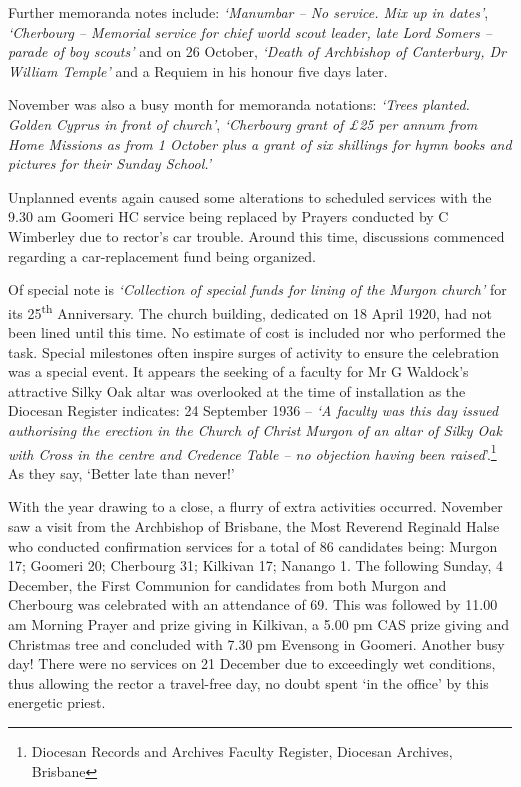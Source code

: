 Further memoranda notes include: \emph{`Manumbar -- No service. Mix up in dates'}, \emph{`Cherbourg -- Memorial service for chief world scout leader, late Lord Somers -- parade of boy scouts'} and on 26 October, \emph{`Death of Archbishop of Canterbury, Dr William Temple'} and a Requiem in his honour five days later.

November was also a busy month for memoranda notations: \emph{`Trees planted. Golden Cyprus in front of church'}, \emph{`Cherbourg grant of £25 per annum from Home Missions as from 1 October plus a grant of six shillings for hymn books and pictures for their Sunday School.'}

Unplanned events again caused some alterations to scheduled services with the 9.30 am Goomeri HC service being replaced by Prayers conducted by C Wimberley due to rector's car trouble. Around this time, discussions commenced regarding a car-replacement fund being organized.

Of special note is \emph{`Collection of special funds for lining of the Murgon church'} for its 25\textsuperscript{th} Anniversary. The church building, dedicated on 18 April 1920, had not been lined until this time. No estimate of cost is included nor who performed the task. Special milestones often inspire surges of activity to ensure the celebration was a special event. It appears the seeking of a faculty for Mr G Waldock's attractive Silky Oak altar was overlooked at the time of installation as the Diocesan Register indicates: 24 September 1936 -- \emph{`A faculty was this day issued authorising the erection in the Church of Christ Murgon of an altar of Silky Oak with Cross in the centre and Credence Table -- no objection having been raised}'.\footnote{Diocesan Records and Archives Faculty Register, Diocesan Archives, Brisbane} As they say, `Better late than never!'

With the year drawing to a close, a flurry of extra activities occurred. November saw a visit from the Archbishop of Brisbane, the Most Reverend Reginald Halse who conducted confirmation services for a total of 86 candidates being: Murgon 17; Goomeri 20; Cherbourg 31; Kilkivan 17; Nanango 1. The following Sunday, 4 December, the First Communion for candidates from both Murgon and Cherbourg was celebrated with an attendance of 69. This was followed by 11.00 am Morning Prayer and prize giving in Kilkivan, a 5.00 pm CAS prize giving and Christmas tree and concluded with 7.30 pm Evensong in Goomeri. Another busy day! There were no services on 21 December due to exceedingly wet conditions, thus allowing the rector a travel-free day, no doubt spent `in the office' by this energetic priest.

